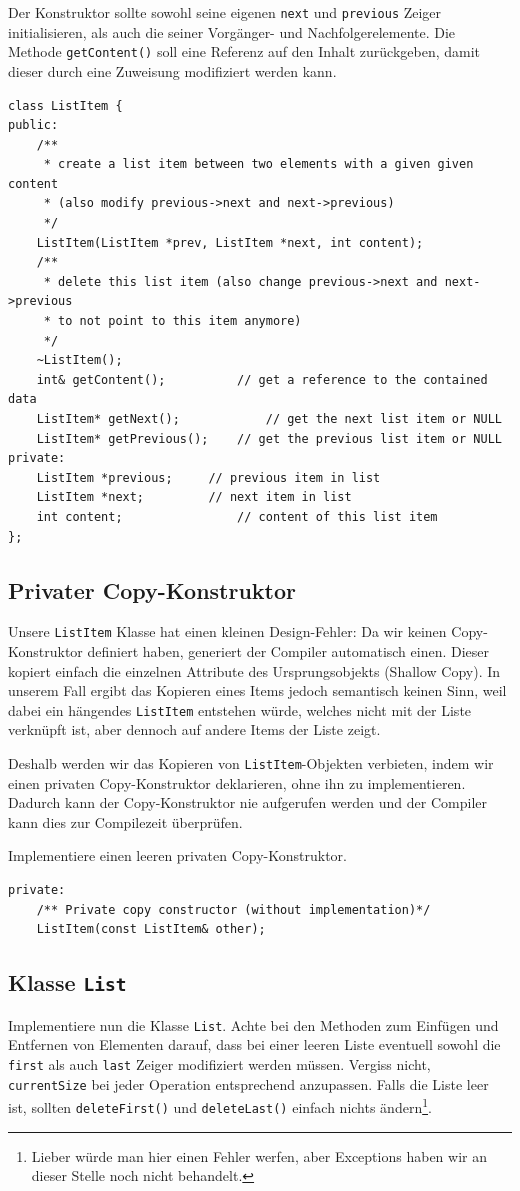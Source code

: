Der Konstruktor sollte sowohl seine eigenen \texttt{next} und \texttt{previous} Zeiger initialisieren, als auch die seiner Vorgänger- und Nachfolgerelemente.
Die Methode \texttt{getContent()} soll eine Referenz auf den Inhalt zurückgeben, damit dieser durch eine Zuweisung modifiziert werden kann.

\begin{lstlisting}
class ListItem {
public:
	/**
	 * create a list item between two elements with a given given content
	 * (also modify previous->next and next->previous)
	 */
	ListItem(ListItem *prev, ListItem *next, int content);
	/**
	 * delete this list item (also change previous->next and next->previous
	 * to not point to this item anymore)
	 */
	~ListItem();				
	int& getContent();			// get a reference to the contained data
	ListItem* getNext();			// get the next list item or NULL
	ListItem* getPrevious();	// get the previous list item or NULL
private:
	ListItem *previous;		// previous item in list
	ListItem *next;			// next item in list
	int content;				// content of this list item
};
\end{lstlisting}

\subsection{Privater Copy-Konstruktor}
Unsere \texttt{ListItem} Klasse hat einen kleinen Design-Fehler:
Da wir keinen Copy-Konstruktor definiert haben, generiert der Compiler automatisch einen.
Dieser kopiert einfach die einzelnen Attribute des Ursprungsobjekts (Shallow Copy).
In unserem Fall ergibt das Kopieren eines Items jedoch semantisch keinen Sinn, weil dabei ein hängendes \texttt{ListItem} entstehen würde, welches nicht mit der Liste verknüpft ist, aber dennoch auf andere Items der Liste zeigt.

Deshalb werden wir das Kopieren von \texttt{ListItem}-Objekten verbieten, indem wir einen privaten Copy-Konstruktor deklarieren, ohne ihn zu implementieren.
Dadurch kann der Copy-Konstruktor nie aufgerufen werden und der Compiler kann dies zur Compilezeit überprüfen.

Implementiere einen leeren privaten Copy-Konstruktor.

\begin{lstlisting}
private:
	/** Private copy constructor (without implementation)*/
	ListItem(const ListItem& other);
\end{lstlisting}

\subsection{Klasse \texttt{List}}
Implementiere nun die Klasse \texttt{List}.
Achte bei den Methoden zum Einfügen und Entfernen von Elementen darauf, dass bei einer leeren Liste eventuell sowohl die \texttt{first} als auch \texttt{last} Zeiger modifiziert werden müssen.
Vergiss nicht, \texttt{currentSize} bei jeder Operation entsprechend anzupassen.
Falls die Liste leer ist, sollten \texttt{deleteFirst()} und \texttt{deleteLast()} einfach nichts ändern\footnote{Lieber würde man hier einen Fehler werfen, aber Exceptions haben wir an dieser Stelle noch nicht behandelt.}.

